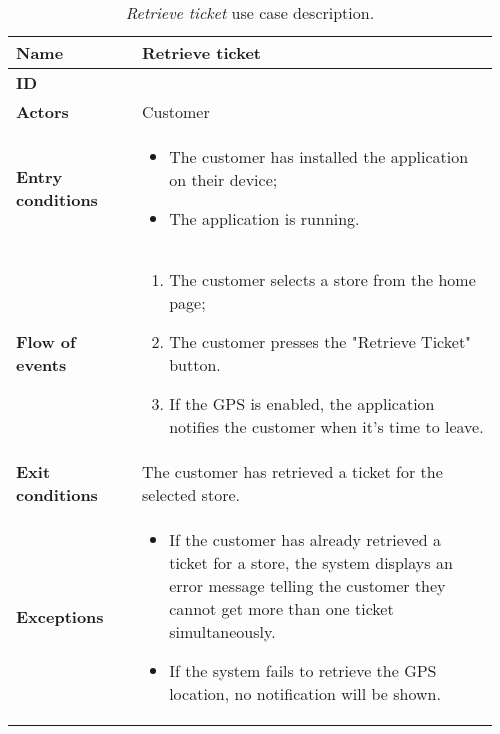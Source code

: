 	\begin{table}[H]
    	\centering
		\begin{tabular}{@{}p{0.25\linewidth}p{0.71\linewidth}@{}}
			\toprule
			\textbf{Name} & Retrieve ticket \\

			\midrule
			\textbf{ID} & \usecaseindex{uc:retrieveTicket} ~\\
			\midrule
			\textbf{Actors} & Customer \\
			\midrule
			\textbf{Entry conditions} &
				\begin{itemize}[leftmargin=.4cm,noitemsep,topsep=0pt,before=\vspace{-3mm},after=\vspace{-4mm}]
					\item The customer has installed the application on their device;
					\item The application is running.
				\end{itemize} \\
			\midrule
			\textbf{Flow of events} &
				\begin{enumerate}[label=\roman*.,leftmargin=.5cm,noitemsep,topsep=0pt,before=\vspace{-3mm},after=\vspace{-4mm}]
					\item The customer selects a store from the home page;
					\item The customer presses the "Retrieve Ticket" button.
                    \item If the GPS is enabled, the application notifies the customer when it's time to leave.
				\end{enumerate} \\
			\midrule
			\textbf{Exit conditions} & The customer has retrieved a ticket for the selected store. \\
			\midrule
			\textbf{Exceptions} &
                \begin{itemize}[leftmargin=.4cm,noitemsep,topsep=0pt,before=\vspace{-3mm},after=\vspace{-4mm}]
                    \item If the customer has already retrieved a ticket for a store, the system displays an error message telling the customer they cannot get more than one ticket simultaneously.
                    \item If the system fails to retrieve the GPS location, no notification will be shown.
                \end{itemize} \\
			\bottomrule
		\end{tabular}
		\caption{\textit{Retrieve ticket} use case description.}
	\end{table}

